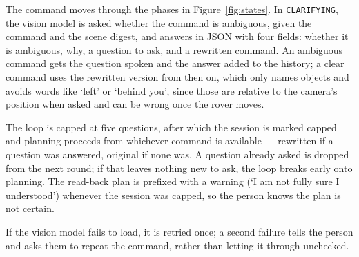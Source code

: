 %
%

The command moves through the phases in Figure~\ref{fig:states}. In \texttt{CLARIFYING}, the
vision model is asked whether the command is ambiguous, given the command and the scene
digest, and answers in JSON with four fields: whether it is ambiguous, why, a question to ask,
and a rewritten command. An ambiguous command gets the question spoken and the answer added to
the history; a clear command uses the rewritten version from then on, which only names objects
and avoids words like `left' or `behind you', since those are relative to the camera's
position when asked and can be wrong once the rover moves.

The loop is capped at five questions, after which the session is marked capped and planning
proceeds from whichever command is available — rewritten if a question was answered, original
if none was. A question already asked is dropped from the next round; if that leaves nothing
new to ask, the loop breaks early onto planning. The read-back plan is prefixed with a warning
(`I am not fully sure I understood') whenever the session was capped, so the person knows the
plan is not certain.

If the vision model fails to load, it is retried once; a second failure tells the person and
asks them to repeat the command, rather than letting it through unchecked.



%

